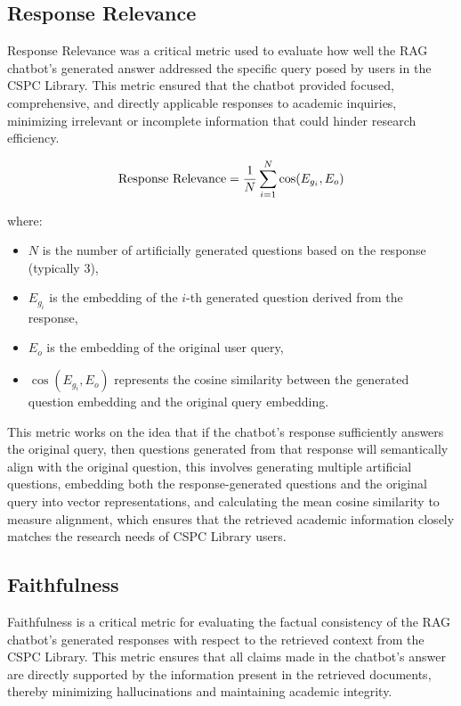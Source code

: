 \begin{refsection}
\subsection*{Response Relevance}

Response Relevance was a critical metric used to evaluate how well the RAG chatbot's generated answer addressed the specific query posed by users in the CSPC Library. This metric ensured that the chatbot provided focused, comprehensive, and directly applicable responses to academic inquiries, minimizing irrelevant or incomplete information that could hinder research efficiency.

\begin{equation}
\centering
\text{Response Relevance} = \frac{1}{N} \sum_{i=1}^{N} \cos(E_{g_i}, E_o)
\end{equation}

where:
\begin{itemize}
    \item $N$ is the number of artificially generated questions based on the response (typically 3),
    \item $E_{g_i}$ is the embedding of the $i$-th generated question derived from the response,
    \item $E_o$ is the embedding of the original user query,
    \item $\cos(E_{g_i}, E_o)$ represents the cosine similarity between the generated question embedding and the original query embedding.
\end{itemize}

This metric works on the idea that if the chatbot's response sufficiently answers the original query, then questions generated from that response will semantically align with the original question, this involves generating multiple artificial questions, embedding both the response-generated questions and the original query into vector representations, and calculating the mean cosine similarity to measure alignment, which ensures that the retrieved academic information closely matches the research needs of CSPC Library users.

\subsection*{Faithfulness}

Faithfulness is a critical metric for evaluating the factual consistency of the RAG chatbot's generated responses with respect to the retrieved context from the CSPC Library. This metric ensures that all claims made in the chatbot's answer are directly supported by the information present in the retrieved documents, thereby minimizing hallucinations and maintaining academic integrity.


\end{refsection}
